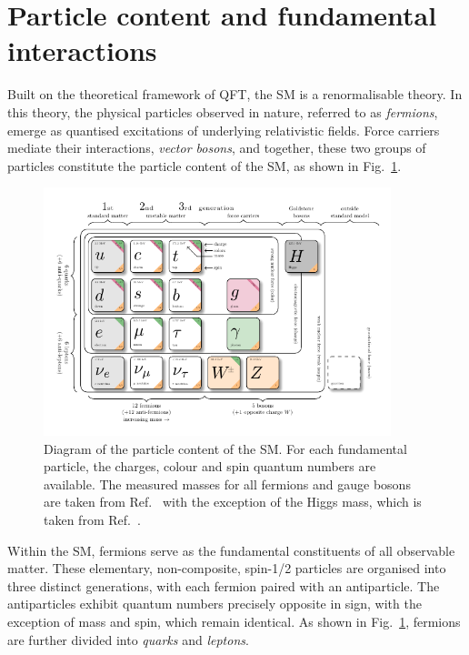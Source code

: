 \section{Particle content and fundamental interactions}
\label{Section:Particle content and fundamental interactions}
Built on the theoretical framework of \ac{QFT}, the \ac{SM} is a renormalisable theory. In this theory, the physical particles observed in nature, referred to as \textit{fermions}, emerge as quantised excitations of underlying relativistic fields. Force carriers mediate their interactions, \textit{vector bosons}, and together, these two groups of particles constitute the particle content of the \ac{SM}, as shown in Fig.~\ref{Figure:Introduction_1}.

\begin{figure}[ht]
\centering
\includegraphics[width= 0.9\textwidth]{Figures/Introduction/Particles.pdf}
\caption[Diagram of the particle content of the Standard Model]{Diagram of the particle content of the \ac{SM}. For each fundamental particle, the charges, colour and spin quantum numbers are available. The measured masses for all fermions and gauge bosons are taken from Ref.~\cite{ParticleMasses} with the exception of the Higgs mass, which is taken from Ref.~\cite{Higgs_Mass}.}
\label{Figure:Introduction_1}
\end{figure}

Within the \ac{SM}, fermions serve as the fundamental constituents of all observable matter. These elementary, non-composite, spin-1/2 particles are organised into three distinct generations, with each fermion paired with an antiparticle. The antiparticles exhibit quantum numbers precisely opposite in sign, with the exception of mass and spin, which remain identical. As shown in Fig.~\ref{Figure:Introduction_1}, fermions are further divided into \textit{quarks} and \textit{leptons}. 


